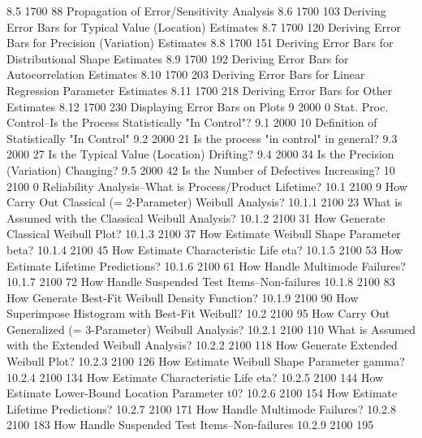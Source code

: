 8.5             1700        88
Propagation of Error/Sensitivity Analysis
8.6             1700       103
Deriving Error Bars for Typical Value (Location) Estimates
8.7             1700       120
Deriving Error Bars for Precision (Variation) Estimates
8.8             1700       151
Deriving Error Bars for Distributional Shape Estimates
8.9             1700       192
Deriving Error Bars for Autocorrelation Estimates
8.10            1700       203
Deriving Error Bars for Linear Regression Parameter Estimates
8.11            1700       218
Deriving Error Bars for Other Estimates
8.12            1700       230
Displaying Error Bars on Plots
9               2000         0
Stat. Proc. Control--Is the Process Statistically "In Control"?
9.1             2000        10
Definition of Statistically "In Control"
9.2             2000        21
Is the process "in control" in general?
9.3             2000        27
Is the Typical Value (Location) Drifting?
9.4             2000        34
Is the Precision (Variation) Changing?
9.5             2000        42
Is the Number of Defectives Increasing?
10              2100         0
Reliability Analysis--What is Process/Product Lifetime?
10.1            2100         9
How Carry Out Classical (= 2-Parameter) Weibull Analysis?
10.1.1          2100        23
What is Assumed with the Classical Weibull Analysis?
10.1.2          2100        31
How Generate Classical Weibull Plot?
10.1.3          2100        37
How Estimate Weibull Shape Parameter beta?
10.1.4          2100        45
How Estimate Characteristic Life eta?
10.1.5          2100        53
How Estimate Lifetime Predictions?
10.1.6          2100        61
How Handle Multimode Failures?
10.1.7          2100        72
How Handle Suspended Test Items--Non-failures
10.1.8          2100        83
How Generate Best-Fit Weibull Density Function?
10.1.9          2100        90
How Superimpose Histogram with Best-Fit Weibull?
10.2            2100        95
How Carry Out Generalized (= 3-Parameter) Weibull Analysis?
10.2.1          2100       110
What is Assumed with the Extended Weibull Analysis?
10.2.2          2100       118
How Generate Extended Weibull Plot?
10.2.3          2100       126
How Estimate Weibull Shape Parameter gamma?
10.2.4          2100       134
How Estimate Characteristic Life eta?
10.2.5          2100       144
How Estimate Lower-Bound Location Parameter t0?
10.2.6          2100       154
How Estimate Lifetime Predictions?
10.2.7          2100       171
How Handle Multimode Failures?
10.2.8          2100       183
How Handle Suspended Test Items--Non-failures
10.2.9          2100       195
